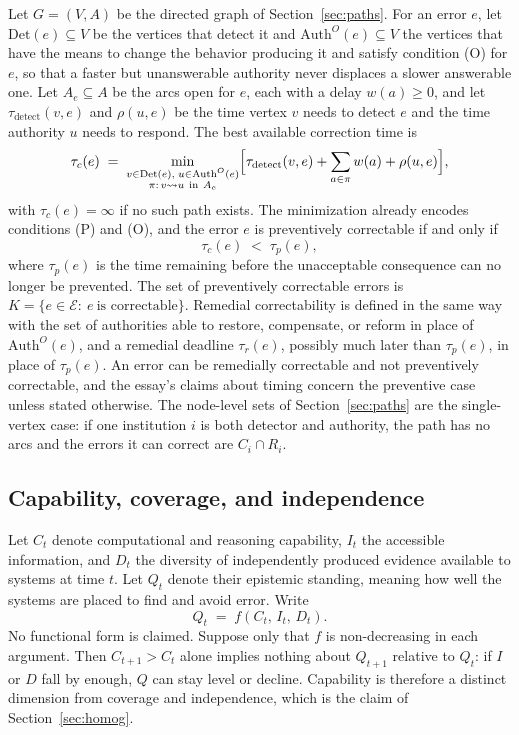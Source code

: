 \documentclass[11pt]{article}
\begin{document}
Let $G=(V,A)$ be the directed graph of Section~\ref{sec:paths}. For an error $e$, let $\mathrm{Det}(e)\subseteq V$ be the vertices that detect it and $\mathrm{Auth}^{O}(e)\subseteq V$ the vertices that have the means to change the behavior producing it and satisfy condition (O) for $e$, so that a faster but unanswerable authority never displaces a slower answerable one. Let $A_e\subseteq A$ be the arcs open for $e$, each with a delay $w(a)\ge 0$, and let $\tau_{\text{detect}}(v,e)$ and $\rho(u,e)$ be the time vertex $v$ needs to detect $e$ and the time authority $u$ needs to respond. The best available correction time is
\[
\tau_c(e)\;=\;\min_{\substack{v\in\mathrm{Det}(e),\;u\in\mathrm{Auth}^{O}(e)\\ \pi:\,v\leadsto u\ \text{in}\ A_e}}\Bigl[\tau_{\text{detect}}(v,e)+\sum_{a\in\pi}w(a)+\rho(u,e)\Bigr],
\]
with $\tau_c(e)=\infty$ if no such path exists. The minimization already encodes conditions (P) and (O), and the error $e$ is preventively correctable if and only if
\[
\tau_c(e)\;<\;\tau_p(e),
\]
where $\tau_p(e)$ is the time remaining before the unacceptable consequence can no longer be prevented. The set of preventively correctable errors is $K=\{e\in\mathcal{E}:\ e\ \text{is correctable}\}$. Remedial correctability is defined in the same way with the set of authorities able to restore, compensate, or reform in place of $\mathrm{Auth}^{O}(e)$, and a remedial deadline $\tau_r(e)$, possibly much later than $\tau_p(e)$, in place of $\tau_p(e)$. An error can be remedially correctable and not preventively correctable, and the essay's claims about timing concern the preventive case unless stated otherwise. The node-level sets of Section~\ref{sec:paths} are the single-vertex case: if one institution $i$ is both detector and authority, the path has no arcs and the errors it can correct are $C_i\cap R_i$.

\subsection{Capability, coverage, and independence}

Let $C_t$ denote computational and reasoning capability, $I_t$ the accessible information, and $D_t$ the diversity of independently produced evidence available to systems at time $t$. Let $Q_t$ denote their epistemic standing, meaning how well the systems are placed to find and avoid error. Write
\[
Q_t \;=\; f(C_t,\,I_t,\,D_t).
\]
No functional form is claimed. Suppose only that $f$ is non-decreasing in each argument. Then $C_{t+1}>C_t$ alone implies nothing about $Q_{t+1}$ relative to $Q_t$: if $I$ or $D$ fall by enough, $Q$ can stay level or decline. Capability is therefore a distinct dimension from coverage and independence, which is the claim of Section~\ref{sec:homog}.
\end{document}
